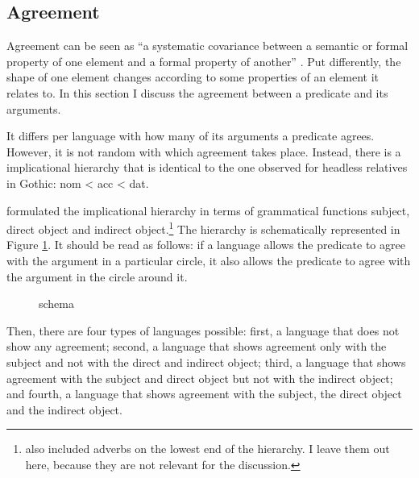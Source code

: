 \subsection{Agreement}

Agreement can be seen as ``a systematic covariance between a semantic or formal property of one element and a formal property of another'' \citep{steel1978}. Put differently, the shape of one element changes according to some properties of an element it relates to. In this section I discuss the agreement between a predicate and its arguments.

It differs per language with how many of its arguments a predicate agrees. However, it is not random with which agreement takes place. Instead, there is a implicational hierarchy that is identical to the one observed for headless relatives in Gothic: \ac{nom} < \ac{acc} < \ac{dat}.

\citet{moravcsik1978} formulated the implicational hierarchy in terms of grammatical functions subject, direct object and indirect object.\footnote{
\citet{moravcsik1978} also included adverbs on the lowest end of the hierarchy. I leave them out here, because they are not relevant for the discussion.
}
The hierarchy is schematically represented in Figure \ref{fig:agr-sub-do-io}. It should be read as follows: if a language allows the predicate to agree with the argument in a particular circle, it also allows the predicate to agree with the argument in the circle around it.

\begin{figure}[H]
  \centering
  \caption{ schema}
  \label{fig:agr-sub-do-io}
\end{figure}

Then, there are four types of languages possible: first, a language that does not show any agreement; second, a language that shows agreement only with the subject and not with the direct and indirect object; third, a language that shows agreement with the subject and direct object but not with the indirect object; and fourth, a language that shows agreement with the subject, the direct object and the indirect object.

